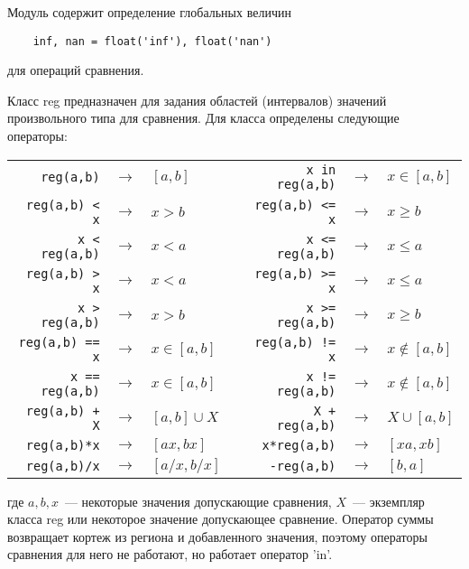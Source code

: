 Модуль содержит определение глобальных величин
\begin{verbatim}
    inf, nan = float('inf'), float('nan')
\end{verbatim}
для операций сравнения.

Класс {\sf reg} предназначен для задания областей (интервалов) значений
произвольного типа для сравнения. Для класса определены следующие операторы:
\begin{center}
\begin{tabular}{rclcrcl}
\verb'reg(a,b)' &$\to$& $[a,b]$ &\rule{1cm}{0pt}&
\verb'x in reg(a,b)' &$\to$& $x\in [a,b]$ \\
\verb'reg(a,b) < x' &$\to$& $x>b$ && 
\verb'reg(a,b) <= x' &$\to$& $x\ge b$ \\
\verb'x < reg(a,b)' &$\to$& $x<a$ && 
\verb'x <= reg(a,b)' &$\to$& $x\le a$ \\
\verb'reg(a,b) > x' &$\to$& $x<a$ &&
\verb'reg(a,b) >= x' &$\to$& $x\le a$ \\
\verb'x > reg(a,b)' &$\to$& $x>b$ &&
\verb'x >= reg(a,b)' &$\to$& $x\ge b$ \\
\verb'reg(a,b) == x' &$\to$& $x \in [a,b]$ &&
\verb'reg(a,b) != x' &$\to$& $x \notin [a,b] $ \\
\verb'x == reg(a,b)' &$\to$& $x \in [a,b]$ &&
\verb'x != reg(a,b)' &$\to$& $x \notin [a,b] $ \\
\verb'reg(a,b) + X' &$\to$& $[a,b] \cup X$ &&
\verb'X + reg(a,b)' &$\to$& $X \cup [a,b]$ \\
\verb'reg(a,b)*x' &$\to$& $[ax,bx]$ &&
\verb'x*reg(a,b)' &$\to$& $[xa,xb]$ \\
\verb'reg(a,b)/x' &$\to$& $[a/x,b/x]$ &&
\verb'-reg(a,b)' &$\to$& $[b,a]$ \\
\end{tabular}
\end{center}
где $a, b, x$~--- некоторые значения допускающие сравнения, $X$~--- экземпляр
класса {\sf reg} или некоторое значение допускающее сравнение. Оператор суммы
возвращает кортеж из региона и добавленного значения, поэтому операторы
сравнения для него не работают, но работает оператор {\sf 'in'}.
